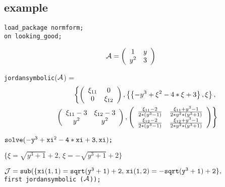 \subsection{example}

{\tt load\_package normform;}\\
{\tt on looking\_good;} 

\begin{displaymath}
{\cal A} = \left( \begin{array}{cc} 1 & y \\ y^2 & 3  \end{array} 
\right)
\end{displaymath}

{\tt jordansymbolic}(${\cal A}$) = 
\begin{eqnarray}
 & & \left\{ \left( \begin{array}{cc} \xi_{11} & 0 \\ 0 & \xi_{12}
\end{array} \right) ,
\left\{ \left\{ -y^3+\xi^2-4*\xi+3 \right\}, \xi \right\}, \right. 
\nonumber \\ & & \hspace{0.1in} \left. \left( \begin{array}{cc} 
\xi_{11} -3 & \xi_{12} -3 \\ y^2 & y^2 
\end{array} \right), \left( \begin{array}{cc} \frac{\xi_{11} -2}
{2*(y^3-1)} & \frac{\xi_{11} + y^3 -1}{2*y^2*(y^3+1)} \\ 
\frac{\xi_{12} -2}{2*(y^3-1)} & \frac{\xi_{12}+y^3-1}{2*y^2*(y^3+1)}
\end{array} \right) \right\} \nonumber
\end{eqnarray}

\vspace{0.2in}
\begin{flushleft}
\begin{math}
{\tt solve(-y^3+xi^2-4*xi+3,xi)}${\tt ;}$
\end{math}
\end{flushleft}

\vspace{0.1in}
\begin{center}
\begin{math}
\{ \xi = \sqrt{y^3+1} + 2,\, \xi = -\sqrt{y^3+1}+2 \}
\end{math}
\end{center}

\vspace{0.1in}
\begin{math}
{\tt {\cal J}  = sub}{\tt (}{\tt \{ xi(1,1)=sqrt(y^3+1)+2,\, xi(1,2) = 
-sqrt(y^3+1)+2\},} 
\end{math}
\\ \hspace*{0.29in} {\tt first  jordansymbolic (${\cal A}$));} 
 
